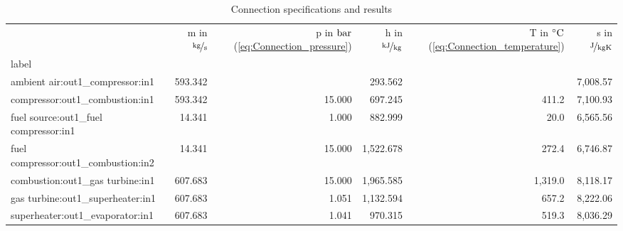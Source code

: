 \documentclass[]{article}
\newcommand{\bftab}{\fontseries{b}\selectfont}
\begin{document}
\begin{table}[H]
\centering
\caption{Connection specifications and results}
\begin{tabular}{lrrrrr}
\toprule
{} & m in $\unitfrac[]{kg}{s}$ & p in $\unit[]{bar}$ (\ref{eq:Connection_pressure}) & h in $\unitfrac[]{kJ}{kg}$ & T in $\unit[]{^\circ C}$ (\ref{eq:Connection_temperature}) & s in $\unitfrac[]{J}{kgK}$ \\
label                                                          &                           &                                                    &                            &                                                            &                            \\
\midrule
ambient air:out1\_compressor:in1                               &                   593.342 &                                       \bftab 1.000 &                    293.562 &                                                \bftab 20.0 &                   7,008.57 \\
compressor:out1\_combustion:in1                                &                   593.342 &                                             15.000 &                    697.245 &                                                      411.2 &                   7,100.93 \\
fuel source:out1\_fuel compressor:in1                          &                    14.341 &                                              1.000 &                    882.999 &                                                       20.0 &                   6,565.56 \\
fuel compressor:out1\_combustion:in2                           &                    14.341 &                                             15.000 &                  1,522.678 &                                                      272.4 &                   6,746.87 \\
combustion:out1\_gas turbine:in1                               &                   607.683 &                                             15.000 &                  1,965.585 &                                                    1,319.0 &                   8,118.17 \\
gas turbine:out1\_superheater:in1                              &                   607.683 &                                              1.051 &                  1,132.594 &                                                      657.2 &                   8,222.06 \\
superheater:out1\_evaporator:in1                               &                   607.683 &                                              1.041 &                    970.315 &                                                      519.3 &                   8,036.29 \\

\end{tabular}
\end{table}
\end{document}

